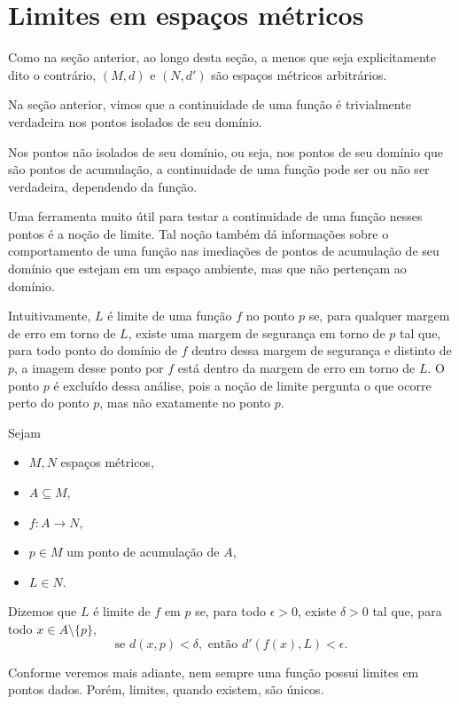\section{Limites em espaços métricos}

Como na seção anterior, ao longo desta seção, a menos que seja explicitamente dito o contrário, $(M, d)$ e $(N, d')$ são espaços métricos arbitrários.

Na seção anterior, vimos que a continuidade de uma função é trivialmente verdadeira nos pontos isolados de seu domínio.

Nos pontos não isolados de seu domínio, ou seja, nos pontos de seu domínio que são pontos de acumulação, a continuidade de uma função pode ser ou não ser verdadeira, dependendo da função.

Uma ferramenta muito útil para testar a continuidade de uma função nesses pontos é a noção de limite.
Tal noção também dá informações sobre o comportamento de uma função nas imediações de pontos de acumulação de seu domínio que estejam em um espaço ambiente, mas que não pertençam ao domínio.

Intuitivamente, $L$ é limite de uma função $f$ no ponto $p$ se, para qualquer margem de erro em torno de $L$, existe uma margem de segurança em torno de $p$ tal que, para todo ponto do domínio de $f$ dentro dessa margem de segurança e distinto de $p$, a imagem desse ponto por $f$ está dentro da margem de erro em torno de $L$.
O ponto $p$ é excluído dessa análise, pois a noção de limite pergunta o que ocorre perto do ponto $p$, mas não exatamente no ponto $p$.

\begin{definition}
    Sejam
    \begin{itemize}
        \item $M, N$ espaços métricos,
        \item $A\subseteq M$,
        \item $f: A \to N$,
        \item $p \in M$ um ponto de acumulação de $A$,
        \item $L \in N$.
    \end{itemize}
    Dizemos que $L$ é limite de $f$ em $p$ se, para todo $\epsilon > 0$, existe $\delta > 0$ tal que, para todo $x \in A\setminus\{p\}$,
    \[
        \text{se } d(x, p) < \delta, \text{ então } d'(f(x), L) < \epsilon.
    \]
\end{definition}

Conforme veremos mais adiante, nem sempre uma função possui limites em pontos dados.
Porém, limites, quando existem, são únicos.

